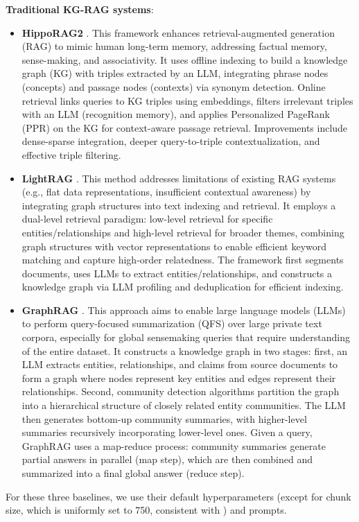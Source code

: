 \textbf{Traditional KG-RAG systems}:
\begin{itemize}[leftmargin=*]
\item \textbf{HippoRAG2} \cite{Main6}. This framework enhances retrieval-augmented generation (RAG) to mimic human long-term memory, addressing factual memory, sense-making, and associativity. It uses offline indexing to build a knowledge graph (KG) with triples extracted by an LLM, integrating phrase nodes (concepts) and passage nodes (contexts) via synonym detection. Online retrieval links queries to KG triples using embeddings, filters irrelevant triples with an LLM (recognition memory), and applies Personalized PageRank (PPR) on the KG for context-aware passage retrieval. Improvements include dense-sparse integration, deeper query-to-triple contextualization, and effective triple filtering.
\item \textbf{LightRAG} \cite{Main2}. This method addresses limitations of existing RAG systems (e.g., flat data representations, insufficient contextual awareness) by integrating graph structures into text indexing and retrieval. It employs a dual-level retrieval paradigm: low-level retrieval for specific entities/relationships and high-level retrieval for broader themes, combining graph structures with vector representations to enable efficient keyword matching and capture high-order relatedness. The framework first segments documents, uses LLMs to extract entities/relationships, and constructs a knowledge graph via LLM profiling and deduplication for efficient indexing. 
\item \textbf{GraphRAG} \cite{Main3}. This approach aims to enable large language models (LLMs) to perform query-focused summarization (QFS) over large private text corpora, especially for global sensemaking queries that require understanding of the entire dataset. It constructs a knowledge graph in two stages: first, an LLM extracts entities, relationships, and claims from source documents to form a graph where nodes represent key entities and edges represent their relationships. Second, community detection algorithms partition the graph into a hierarchical structure of closely related entity communities. The LLM then generates bottom-up community summaries, with higher-level summaries recursively incorporating lower-level ones. Given a query, GraphRAG uses a map-reduce process: community summaries generate partial answers in parallel (map step), which are then combined and summarized into a final global answer (reduce step). 
\end{itemize}
For these three baselines, we use their default hyperparameters (except for chunk size, which is uniformly set to 750, consistent with \ours) and prompts.

